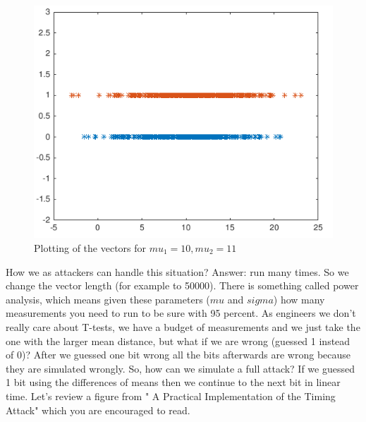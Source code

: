 \begin{figure}[!ht]
    \centering
    \includegraphics[scale=0.6]{images/defmatplot2.png}
    \caption{Plotting of the vectors for \(mu_1 = 10, mu_2 = 11\)} \label{fig:defmatplot2}
\end{figure}

How we as attackers can handle this situation? Answer: run many times. So we
change the vector length (for example to 50000). There is something called power
analysis, which means given these parameters ($mu$ and $sigma$) how many
measurements you need to run to be sure with 95 percent. As engineers we don't really
care about T-tests, we have a budget of measurements and we just take the one
with the larger mean distance, but what if we are wrong (guessed 1 instead of
0)? After we guessed one bit wrong all the bits afterwards are wrong
because they are simulated wrongly. So, how can we simulate a full attack? If we
guessed 1 bit using the differences of means then we continue to the next bit in
linear time. Let's review a figure from " A Practical Implementation of the
Timing Attack" which you are encouraged to read.


